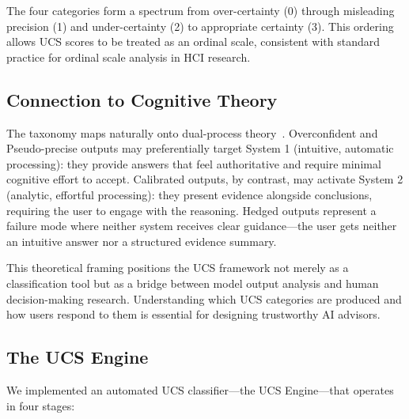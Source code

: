 \documentclass[manuscript, review, anonymous]{acmart}
\begin{document}
The four categories form a spectrum from over-certainty (0) through misleading precision (1) and under-certainty (2) to appropriate certainty (3). This ordering allows UCS scores to be treated as an ordinal scale, consistent with standard practice for ordinal scale analysis in HCI research.

\subsection{Connection to Cognitive Theory}

The taxonomy maps naturally onto dual-process theory~\cite{kahneman2011thinking}. Overconfident and Pseudo-precise outputs may preferentially target System 1 (intuitive, automatic processing): they provide answers that feel authoritative and require minimal cognitive effort to accept. Calibrated outputs, by contrast, may activate System 2 (analytic, effortful processing): they present evidence alongside conclusions, requiring the user to engage with the reasoning. Hedged outputs represent a failure mode where neither system receives clear guidance---the user gets neither an intuitive answer nor a structured evidence summary.

This theoretical framing positions the UCS framework not merely as a classification tool but as a bridge between model output analysis and human decision-making research. Understanding which UCS categories are produced and how users respond to them is essential for designing trustworthy AI advisors.

\subsection{The UCS Engine}

We implemented an automated UCS classifier---the UCS Engine---that operates in four stages:
\end{document}
